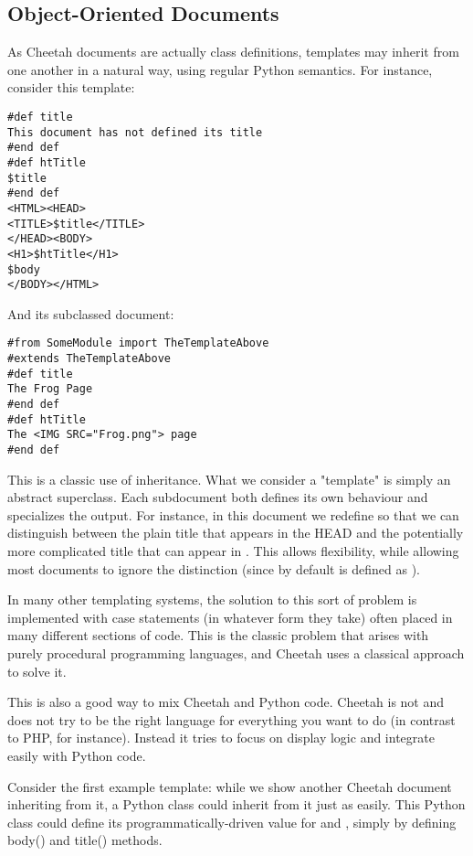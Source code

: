\subsection{Object-Oriented Documents}
\label{howWorks.objoriented}

As Cheetah documents are actually class definitions, templates may inherit from
one another in a natural way, using regular Python semantics. For instance,
consider this template:

\begin{verbatim}
#def title
This document has not defined its title
#end def
#def htTitle
$title
#end def
<HTML><HEAD>
<TITLE>$title</TITLE>
</HEAD><BODY>
<H1>$htTitle</H1>
$body
</BODY></HTML>
\end{verbatim}

And its subclassed document:
\begin{verbatim}
#from SomeModule import TheTemplateAbove
#extends TheTemplateAbove
#def title
The Frog Page
#end def
#def htTitle
The <IMG SRC="Frog.png"> page
#end def
\end{verbatim}

This is a classic use of inheritance. What we consider a "template" is simply an
abstract superclass. Each subdocument both defines its own behaviour and
specializes the output. For instance, in this document we redefine
 so that we can distinguish between the plain title that appears
in the HEAD and the potentially more complicated title that can appear in
.  This allows flexibility, while allowing most documents to ignore the
distinction (since by default  is defined as ).

In many other templating systems, the solution to this sort of problem is
implemented with case statements (in whatever form they take) often placed in
many different sections of code. This is the classic problem that arises with
purely procedural programming languages, and Cheetah uses a classical approach
to solve it.

This is also a good way to mix Cheetah and Python code. Cheetah is not and does
not try to be the right language for everything you want to do (in contrast to
PHP, for instance). Instead it tries to focus on display logic and integrate
easily with Python code.

Consider the first example template: while we show another Cheetah document
inheriting from it, a Python class could inherit from it just as easily. This
Python class could define its programmatically-driven value for 
and , simply by defining body() and title() methods.

